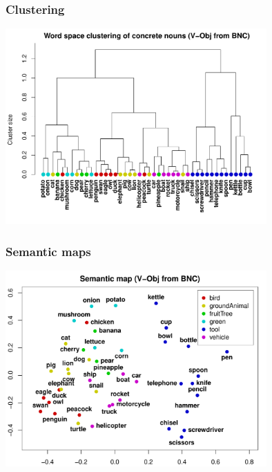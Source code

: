 \begin{frame}[c]
  \frametitle{Clustering}

  \begin{center}
    \includegraphics[width=100mm]{img/hieroglyph_clustering}
  \end{center}
\end{frame}

\begin{frame}[c]
  \frametitle{Semantic maps}

  \begin{center}
    \includegraphics[width=100mm]{img/hieroglyph_semantic_map}
  \end{center}
\end{frame}

